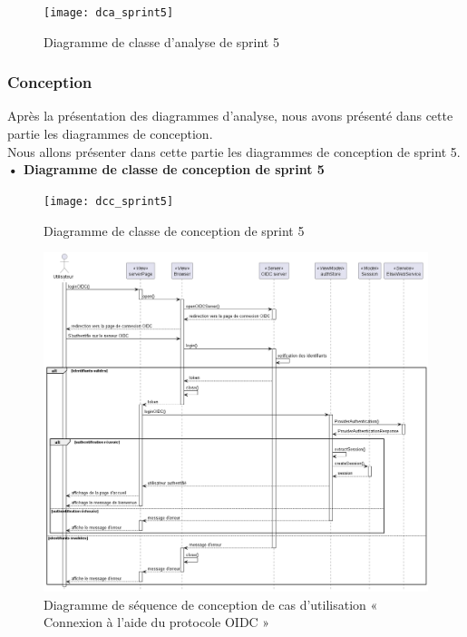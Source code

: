 \begin{figure}[H]
  \centering
  \texttt{[image: dca\_sprint5]}
  \caption{Diagramme de classe d'analyse de sprint 5}
  \label{fig:class_analyse_sprint5}
\end{figure}


\subsubsection{Conception}

Après la présentation des diagrammes d'analyse, nous avons présenté dans cette partie les diagrammes de conception.\\ 
Nous allons présenter dans cette partie les diagrammes de conception de sprint 5. \\
\textbf{•	Diagramme de classe de conception de sprint 5}

\begin{figure}[H]
  \centering
  \texttt{[image: dcc\_sprint5]}
  \caption{Diagramme de classe de conception de sprint 5}
  \label{fig:class_diagram_51}
\end{figure}


\begin{figure}[H]
  \centering
  \includegraphics[width=1\textwidth]{out/diagrams/sprint5/sequence_OIDC/sequence_OIDC}
  \caption{Diagramme de séquence de conception de cas d'utilisation « Connexion à l’aide du protocole OIDC »}
  \label{fig:sequence_conception_auth_OIDC}
\end{figure}

